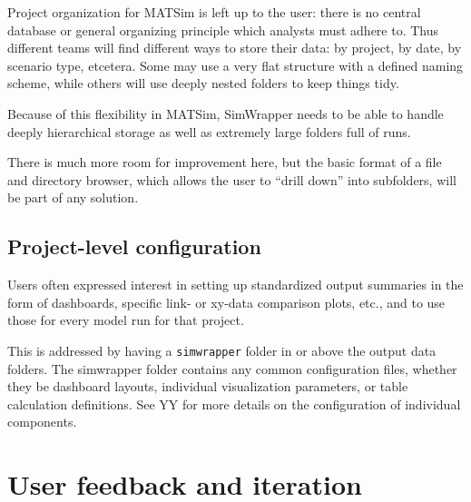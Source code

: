 Project organization for MATSim is left up to the user: there is no
central database or general organizing principle which analysts must
adhere to. Thus different teams will find different ways to store their
data: by project, by date, by scenario type, etcetera. Some may use a
very flat structure with a defined naming scheme, while others will use
deeply nested folders to keep things tidy.

Because of this flexibility in MATSim, SimWrapper needs to be able to
handle deeply hierarchical storage as well as extremely large folders
full of runs.

There is much more room for improvement here, but the basic format of a
file and directory browser, which allows the user to ``drill down'' into
subfolders, will be part of any solution.


\hypertarget{project-level-configuration}{%
\subsection{Project-level
configuration}\label{project-level-configuration}}

Users often expressed interest in setting up standardized output
summaries in the form of dashboards, specific link- or xy-data
comparison plots, etc., and to use those for every model run for that
project.

This is addressed by having a \texttt{simwrapper} folder in or above the
output data folders. The simwrapper folder contains any common
configuration files, whether they be dashboard layouts, individual
visualization parameters, or table calculation definitions. See YY for
more details on the configuration of individual components.


\hypertarget{user-feedback-and-iteration}{%
\section{User feedback and
iteration}\label{simwrapper-user-feedback}}

